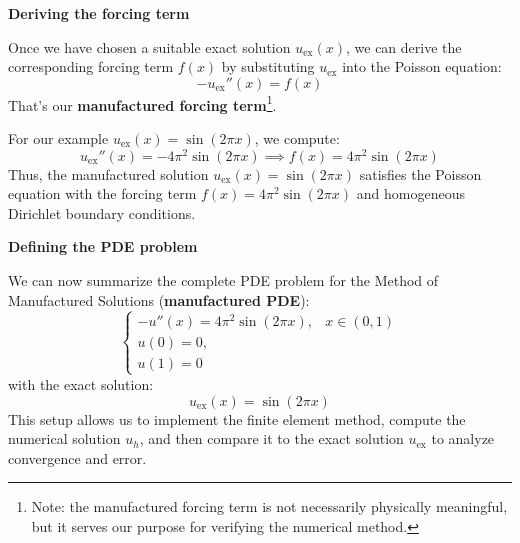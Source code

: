 \highspace
\begin{flushleft}
    \textcolor{Green3}{ \textbf{Deriving the forcing term}}
\end{flushleft}
Once we have chosen a suitable exact solution $u_\text{ex}(x)$, we can derive the corresponding forcing term $f(x)$ by substituting $u_\text{ex}$ into the Poisson equation:
\begin{equation*}
    -u_\text{ex}''(x) = f(x)
\end{equation*}
That's our \textbf{manufactured forcing term}\footnote{%
    Note: the manufactured forcing term is not necessarily physically meaningful, but it serves our purpose for verifying the numerical method.
}.
\begin{examplebox}
    For our example $u_\text{ex}(x) = \sin(2 \pi x)$, we compute:
    \begin{equation*}
        u_\text{ex}''(x) = -4 \pi^2 \sin(2 \pi x) \implies f(x) = 4 \pi^2 \sin(2 \pi x)
    \end{equation*}
    Thus, the manufactured solution $u_\text{ex}(x) = \sin(2 \pi x)$ satisfies the Poisson equation with the forcing term $f(x) = 4 \pi^2 \sin(2 \pi x)$ and homogeneous Dirichlet boundary conditions.
\end{examplebox}

\highspace
\begin{flushleft}
    \textcolor{Green3}{ \textbf{Defining the PDE problem}}
\end{flushleft}
We can now summarize the complete PDE problem for the Method of Manufactured Solutions (\textbf{manufactured PDE}):
\begin{equation*}
    \begin{cases}
        -u''(x) = 4 \pi^2 \sin(2 \pi x), & x \in (0, 1) \\
        u(0) = 0, \\
        u(1) = 0
    \end{cases}
\end{equation*}
with the exact solution:
\begin{equation*}
    u_\text{ex}(x) = \sin(2 \pi x)
\end{equation*}
This setup allows us to implement the finite element method, compute the numerical solution $u_h$, and then compare it to the exact solution $u_\text{ex}$ to analyze convergence and error. 

